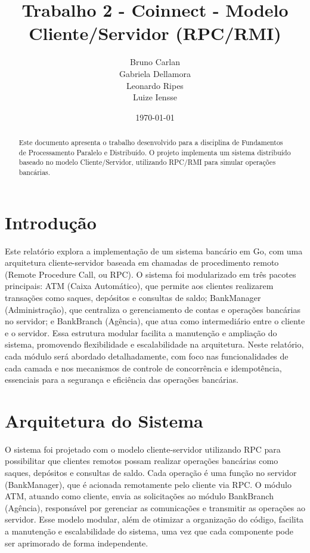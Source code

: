 \documentclass[a4paper,10pt]{article}
\title{Trabalho 2 - Coinnect - Modelo Cliente/Servidor (RPC/RMI)}
\author{Bruno Carlan \\ Gabriela Dellamora \\ Leonardo Ripes \\ Luize Iensse}
\date{\today}
\begin{document}
\maketitle

\begin{abstract}
Este documento apresenta o trabalho desenvolvido para a disciplina de Fundamentos de Processamento Paralelo e Distribuído. O projeto implementa um sistema distribuído baseado no modelo Cliente/Servidor, utilizando RPC/RMI para simular operações bancárias.

\end{abstract}

\begin{multicols}{2}

\section{Introdução}

Este relatório explora a implementação de um sistema bancário em Go, com uma arquitetura cliente-servidor baseada em chamadas de procedimento remoto (Remote Procedure Call, ou RPC). O sistema foi modularizado em três pacotes principais: ATM (Caixa Automático), que permite aos clientes realizarem transações como saques, depósitos e consultas de saldo; BankManager (Administração), que centraliza o gerenciamento de contas e operações bancárias no servidor; e BankBranch (Agência), que atua como intermediário entre o cliente e o servidor. Essa estrutura modular facilita a manutenção e ampliação do sistema, promovendo flexibilidade e escalabilidade na arquitetura. Neste relatório, cada módulo será abordado detalhadamente, com foco nas funcionalidades de cada camada e nos mecanismos de controle de concorrência e idempotência, essenciais para a segurança e eficiência das operações bancárias.

\section{Arquitetura do Sistema}

O sistema foi projetado com o modelo cliente-servidor utilizando RPC para possibilitar que clientes remotos possam realizar operações bancárias como saques, depósitos e consultas de saldo. Cada operação é uma função no servidor (BankManager), que é acionada remotamente pelo cliente via RPC. O módulo ATM, atuando como cliente, envia as solicitações ao módulo BankBranch (Agência), responsável por gerenciar as comunicações e transmitir as operações ao servidor. Esse modelo modular, além de otimizar a organização do código, facilita a manutenção e escalabilidade do sistema, uma vez que cada componente pode ser aprimorado de forma independente.


\end{multicols}
\end{document}

